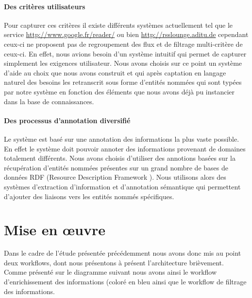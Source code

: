 \documentclass[]{easychair}
\begin{document}
\paragraph*{Des critères utilisateurs}
Pour capturer ces critères il existe différents systèmes actuellement tel que le service \url{http://www.google.fr/reader/} ou bien \url{http://rsslounge.aditu.de} cependant ceux-ci ne proposent pas de regroupement des flux et de filtrage multi-critère de ceux-ci.
En effet, nous avions besoin d'un système intuitif qui permet de capturer simplement les exigences utilisateur. Nous avons choisis sur ce point un système d'aide au choix que nous avons construit et qui après captation en langage naturel des besoins les retranscrit sous forme d'entités nommées qui sont typées par notre système en fonction des éléments que nous avons déjà pu instancier dans la base de connaissances.

\paragraph*{Des processus d'annotation diversifié}
Le système est basé sur une annotation des informations la plus vaste possible. En effet le système doit pouvoir annoter des informations provenant de domaines totalement différents.
Nous avons choisis d'utiliser des annotions basées sur la récupération d'entités nommées présentes sur un grand nombre de bases de données RDF (Resource Description Framework \cite{Winer2005}).
Nous utilisons alors des systèmes d'extraction d'information et d'annotation sémantique qui permettent d'ajouter des liaisons vers les entités nommés spécifiques.



\section{Mise en œuvre}
\label{sect:miseEnOuvre}
Dans le cadre de l'étude présentée précédemment nous avons donc mis au point deux workflows, dont nous présentons à présent l'architecture brièvement. Comme présenté sur le diagramme suivant nous avons ainsi le workflow d'enrichissement des informations (coloré en bleu ainsi que le workflow de filtrage des informations.
\end{document}
